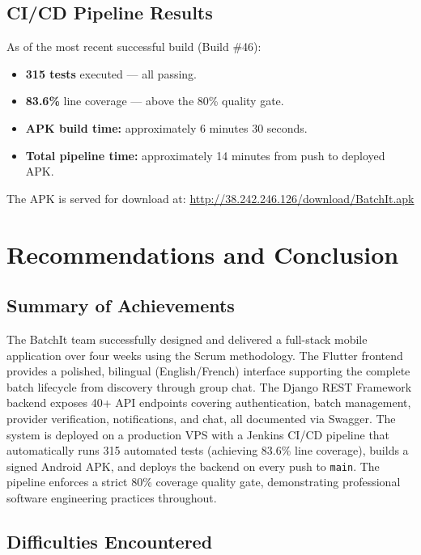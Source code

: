 \documentclass[12pt, a4paper]{report}
\begin{document}
\section{CI/CD Pipeline Results}

As of the most recent successful build (Build \#46):
\begin{itemize}[leftmargin=*]
  \item \textbf{315 tests} executed --- all passing.
  \item \textbf{83.6\%} line coverage --- above the 80\% quality gate.
  \item \textbf{APK build time:} approximately 6 minutes 30 seconds.
  \item \textbf{Total pipeline time:} approximately 14 minutes from push to deployed APK.
\end{itemize}

The APK is served for download at: \url{http://38.242.246.126/download/BatchIt.apk}

\chapter{Recommendations and Conclusion}

\section{Summary of Achievements}

The BatchIt team successfully designed and delivered a full-stack mobile application over four weeks using the Scrum methodology. The Flutter frontend provides a polished, bilingual (English/French) interface supporting the complete batch lifecycle from discovery through group chat. The Django REST Framework backend exposes 40+ API endpoints covering authentication, batch management, provider verification, notifications, and chat, all documented via Swagger. The system is deployed on a production VPS with a Jenkins CI/CD pipeline that automatically runs 315 automated tests (achieving 83.6\% line coverage), builds a signed Android APK, and deploys the backend on every push to \texttt{main}. The pipeline enforces a strict 80\% coverage quality gate, demonstrating professional software engineering practices throughout.

\section{Difficulties Encountered}
\end{document}
